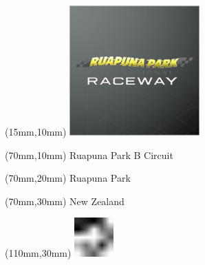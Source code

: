 \null\newpage
\begin{textblock*}{50mm}(15mm,10mm)%
\includegraphics[width=50mm]{LG/RUPU.png}
\end{textblock*}
\begin{textblock*}{130mm}(70mm,10mm)%
{\fontsize{20}{20}\selectfont Ruapuna Park B Circuit}\\
\end{textblock*}
\begin{textblock*}{120mm}(70mm,20mm)%
{\fontsize{16}{16}\selectfont Ruapuna Park}\\
\end{textblock*}
\begin{textblock*}{120mm}(70mm,30mm)%
{\fontsize{12}{12}\selectfont New Zealand}
\end{textblock*}
\begin{textblock*}{30mm}(110mm,30mm)%
\centering
\includegraphics[height=15mm]{icons/fa-rotate-left.pdf}
\end{textblock*}
